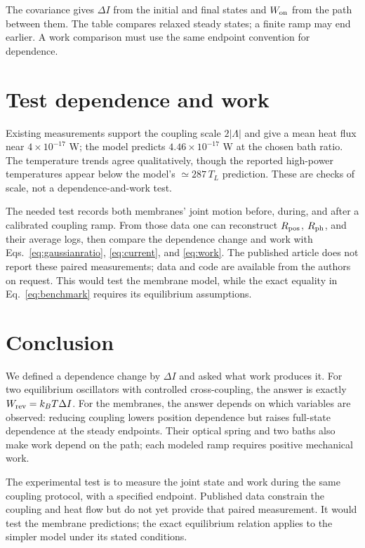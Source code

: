 \documentclass[10pt]{article}
\begin{document}
The covariance gives $\Delta I$ from the initial and final states and $W_{\rm on}$ from the path between them. The table compares relaxed steady states; a finite ramp may end earlier. A work comparison must use the same endpoint convention for dependence.

\section{Test dependence and work}\label{sec:test}
Existing measurements support the coupling scale $2|\Lambda|$ and give a mean heat flux near $4\times10^{-17}$ W; the model predicts $4.46\times10^{-17}$ W at the chosen bath ratio.\cite{yang2020} The temperature trends agree qualitatively, though the reported high-power temperatures appear below the model's $\simeq287\,T_L$ prediction. These are checks of scale, not a dependence-and-work test.

The needed test records both membranes' joint motion before, during, and after a calibrated coupling ramp. From those data one can reconstruct $R_{\rm pos}$, $R_{\rm ph}$, and their average logs, then compare the dependence change and work with Eqs.~\eqref{eq:gaussianratio}, \eqref{eq:current}, and \eqref{eq:work}. The published article does not report these paired measurements; data and code are available from the authors on request.\cite{yang2020} This would test the membrane model, while the exact equality in Eq.~\eqref{eq:benchmark} requires its equilibrium assumptions.

\section{Conclusion}
We defined a dependence change by $\Delta I$ and asked what work produces it. For two equilibrium oscillators with controlled cross-coupling, the answer is exactly $W_{\rm rev}=k_BT\Delta I$. For the membranes, the answer depends on which variables are observed: reducing coupling lowers position dependence but raises full-state dependence at the steady endpoints. Their optical spring and two baths also make work depend on the path; each modeled ramp requires positive mechanical work.

The experimental test is to measure the joint state and work during the same coupling protocol, with a specified endpoint. Published data constrain the coupling and heat flow but do not yet provide that paired measurement. It would test the membrane predictions; the exact equilibrium relation applies to the simpler model under its stated conditions.
\end{document}
